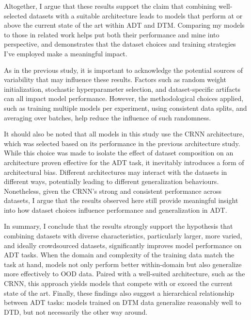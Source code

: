 Altogether, I argue that these results support the claim that combining well-selected datasets with a suitable architecture leads to models that perform at or above the current state of the art within \gls{ADT} and \gls{DTM}. Comparing my models to those in related work helps put both their performance and mine into perspective, and demonstrates that the dataset choices and training strategies I've employed make a meaningful impact.

As in the previous study, it is important to acknowledge the potential sources of variability that may influence these results. Factors such as random weight initialization, stochastic hyperparameter selection, and dataset-specific artifacts can all impact model performance. However, the methodological choices applied, such as training multiple models per experiment, using consistent data splits, and averaging over batches, help reduce the influence of such randomness.

It should also be noted that all models in this study use the \acrfull{CRNN} architecture, which was selected based on its performance in the previous architecture study. While this choice was made to isolate the effect of dataset composition on an architecture proven effective for the \gls{ADT} task, it inevitably introduces a form of architectural bias. Different architectures may interact with the datasets in different ways, potentially leading to different generalization behaviours. Nonetheless, given the \gls{CRNN}'s strong and consistent performance across datasets, I argue that the results observed here still provide meaningful insight into how dataset choices influence performance and generalization in \gls{ADT}.

In summary, I conclude that the results strongly support the hypothesis that combining datasets with diverse characteristics, particularly larger, more varied, and ideally crowdsourced datasets, significantly improves model performance on \gls{ADT} tasks. When the domain and complexity of the training data match the task at hand, models not only perform better within-domain but also generalize more effectively to \acrfull{OOD} data. Paired with a well-suited architecture, such as the \acrshort{CRNN}, this approach yields models that compete with or exceed the current state of the art. Finally, these findings also suggest a hierarchical relationship between \gls{ADT} tasks: models trained on \gls{DTM} data generalize reasonably well to \gls{DTD}, but not necessarily the other way around. 